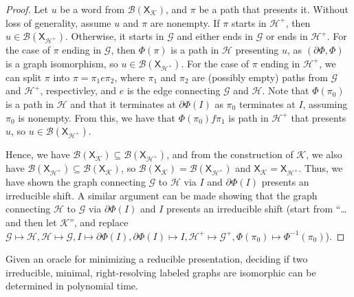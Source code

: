 \documentclass{article}
\newcommand{\Gc}{\mathcal{G}}  %
\newcommand{\Hc}{\mathcal{H}}  %
\newcommand{\Bc}{\mathcal{B}}
\newcommand{\Kc}{\mathcal{K}}
\newcommand{\shift}[1]{\mathsf{X}_{#1}}
\theoremstyle{definition}
\begin{document}
\begin{proof}
        Let \(u\) be a word from \(\Bc(\shift{\Kc})\), and \(\pi\) be a path that presents it.
        Without loss of generality, assume \(u\) and \(\pi\) are nonempty.
        If \(\pi\) starts in \(\Hc^+\), then \(u \in \Bc(\shift{\Hc^+})\). Otherwise, it 
        starts in \(\Gc\) and either ends in \(\Gc\) or ends in \(\Hc^+\). 
        For the case of \(\pi\) ending in \(\Gc\), then \(\Phi(\pi)\) is a path in 
        \(\Hc\) presenting \(u\), as \((\partial\Phi, \Phi)\) is a graph isomorphism,
        so \(u \in \Bc(\shift{\Hc^+})\).
        For the case of \(\pi\) ending in \(\Hc^+\), we can split 
        \(\pi\) into \(\pi=\pi_1 e \pi_2\), where \(\pi_1\) and \(\pi_2\)
        are (possibly empty) paths from \(\Gc\) and \(\Hc^+\), respectivley, and 
        \(e\) is the edge connecting \(\Gc\) and \(\Hc\). Note 
        that \(\Phi(\pi_0)\) is a path in \(\Hc\) and that it terminates
        at \(\partial\Phi(I)\) as \(\pi_0\) terminates at \(I\), assuming \(\pi_0\) is nonempty.
        From this, we have that \(\Phi(\pi_0)f\pi_1\) is path in \(\Hc^+\) that presents \(u\), 
        so \(u \in \Bc(\shift{\Hc^+})\).

        Hence, we have \(\Bc(\shift{\Kc}) \subseteq \Bc(\shift{\Hc^+})\), and from 
        the construction of \(\Kc\), we also have \(\Bc(\shift{\Hc^+}) \subseteq \Bc(\shift{\Kc})\), 
        so \(\Bc(\shift{\Kc}) = \Bc(\shift{\Hc^+})\) and \(\shift{\Kc} = \shift{\Hc^+}\). Thus,
        we have shown the graph connecting \(\Gc\) to \(\Hc\) via \(I\) and \(\partial\Phi(I)\)
        presents an irreducible shift. A similar argument can be made showing that 
        the graph connecting \(\Hc\) to \(\Gc\) via \(\partial\Phi(I)\) and \(I\) presents 
        an irreducible shift (start from ``\dots and then let \(\Kc\)'', and replace
        \(\Gc \mapsto \Hc, \Hc \mapsto \Gc, I \mapsto \partial\Phi(I), \partial\Phi(I) \mapsto I,
        \Hc^+ \mapsto \Gc^+, \Phi(\pi_0) \mapsto \Phi^{-1}(\pi_0)\)).
    \end{proof}

    \begin{theorem}
        Given an oracle for minimizing a reducible presentation, deciding 
        if two irreducible, minimal, right-resolving labeled graphs are isomorphic can be determined in polynomial time.
    \end{theorem}
\end{document}
